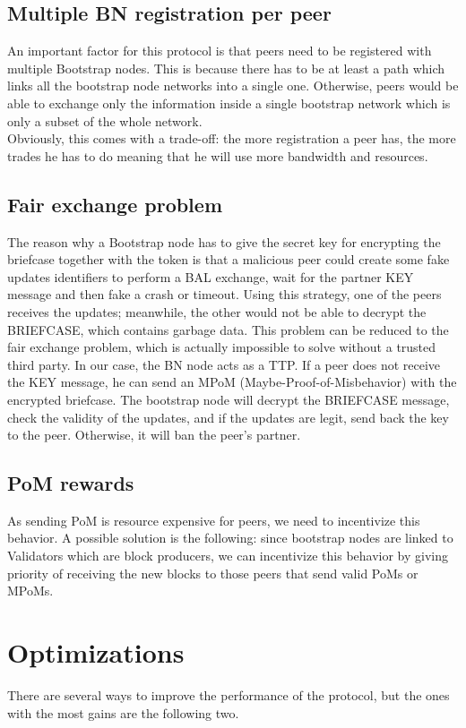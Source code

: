 \documentclass[mscthesis]{usiinfthesis}
\begin{document}
\subsection{Multiple BN registration per peer}
An important factor for this protocol is that peers need to be registered with multiple Bootstrap nodes. This is because there has to be at least a path which links all the bootstrap node networks into a single one. Otherwise, peers would be able to exchange only the information inside a single bootstrap network which is only a subset of the whole network. \\ 
Obviously, this comes with a trade-off: the more registration a peer has, the more trades he has to do meaning that he will use more bandwidth and resources.

\subsection{Fair exchange problem}
The reason why a Bootstrap node has to give the secret key for encrypting the briefcase together with the token is that a malicious peer could create some fake updates identifiers to perform a BAL exchange, wait for the partner KEY message and then fake a crash or timeout. Using this strategy, one of the peers receives the updates; meanwhile, the other would not be able to decrypt the BRIEFCASE, which contains garbage data. This problem can be reduced to the fair exchange problem, which is actually impossible to solve without a trusted third party\citep{pagnia1999impossibility}. In our case, the BN node acts as a TTP. If a peer does not receive the KEY message, he can send an MPoM (Maybe-Proof-of-Misbehavior) with the encrypted briefcase. The bootstrap node will decrypt the BRIEFCASE message, check the validity of the updates, and if the updates are legit, send back the key to the peer. Otherwise, it will ban the peer's partner.

\subsection{PoM rewards}
As sending PoM is resource expensive for peers, we need to incentivize this behavior. A possible solution is the following: since bootstrap nodes are linked to Validators which are block producers, we can incentivize this behavior by giving priority of receiving the new blocks to those peers that send valid PoMs or MPoMs.

\section{Optimizations}
There are several ways to improve the performance of the protocol, but the ones with the most gains are the following two.
\end{document}
